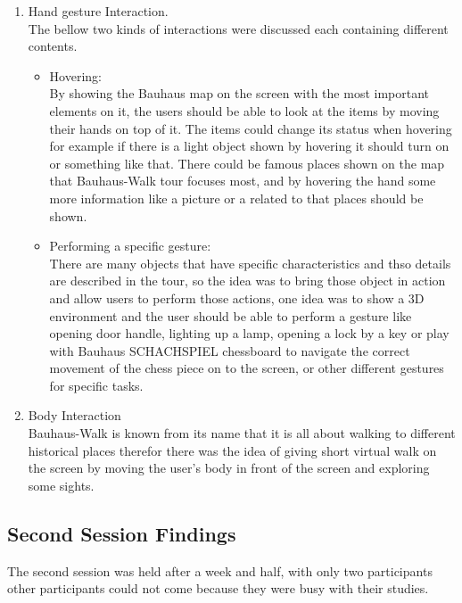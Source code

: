 \begin {enumerate}
\item	Hand gesture Interaction. \\
The bellow two kinds of interactions were discussed each containing different contents. 

\begin {itemize}
\item	Hovering: \\
By showing the Bauhaus map on the screen with the most important elements on it, the users should be able to look at the items by moving their hands on top of it. The items could change its status when hovering for example if there is a light object shown by hovering it should turn on or something like that.
There could be famous places shown on the map that Bauhaus-Walk tour focuses most, and by hovering the hand some more information like a picture or a related to that places should be shown.

\item	Performing a specific gesture:\\
There are many objects that have specific characteristics and thso details are described in the tour, so the idea was to bring those object in action and allow users to perform those actions, one idea was to show a 3D environment and the user should be able to perform a gesture like opening door handle, lighting up a lamp, opening a lock by a key or play with Bauhaus SCHACHSPIEL chessboard to navigate the correct movement of the chess piece on to the screen, or other different gestures for specific tasks.

\end{itemize}

\item	Body Interaction  \\
Bauhaus-Walk is known from its name that it is all about walking to different historical places therefor there was the idea of giving short virtual walk on the screen by moving the user's body in front of the screen and exploring some sights.

\end{enumerate}


\subsection{Second Session Findings}
The second session was held after a week and half, with only two participants other participants could not come because they were busy with their studies. 

